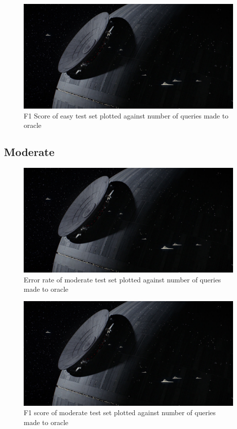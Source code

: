 \documentclass[paper=a4, fontsize=11pt]{scrartcl}
\numberwithin{equation}{section}    %
\numberwithin{figure}{section}      %
\numberwithin{table}{section}       %
\numberwithin{equation}{section}    %
\numberwithin{figure}{section}      %
\numberwithin{table}{section}       %
\begin{document}
\begin{figure}[!htb]
  \centering
  \includegraphics[scale = 0.35]{figures/fig.jpg}
      \caption{F1 Score of easy test set plotted against number of queries made to oracle}
      \label{easyf}
\end{figure}



\FloatBarrier
\subsection{Moderate}

\begin{figure}[!htb]
  \centering
  \includegraphics[scale = 0.35]{figures/fig.jpg}
      \caption{Error rate of moderate test set plotted against number of queries made to oracle}
      \label{moderror}
\end{figure}

\begin{figure}[!htb]
  \centering
  \includegraphics[scale = 0.35]{figures/fig.jpg}
      \caption{F1 score of moderate test set plotted against number of queries made to oracle}
      \label{modf}
\end{figure}
\FloatBarrier
\end{document}
